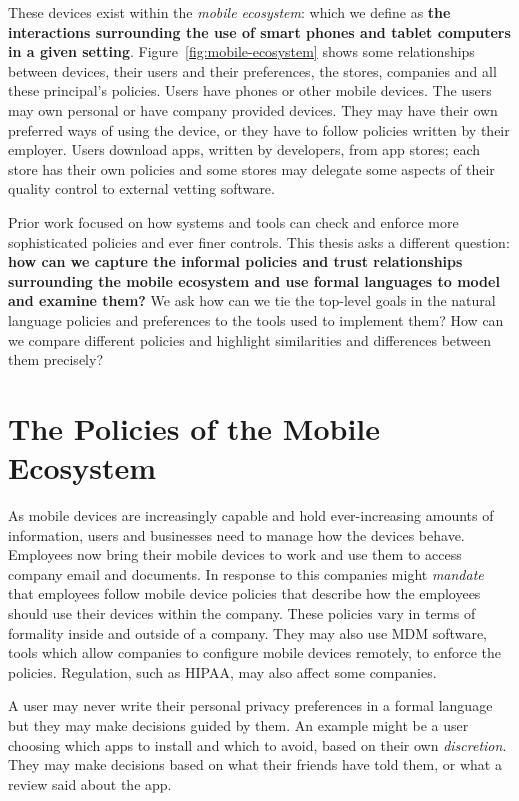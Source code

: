 \documentclass[thesis.tex]{subfiles}
\begin{document}
These devices exist within the \emph{mobile ecosystem}: which we
define as \textbf{the interactions surrounding the use of smart phones
and tablet computers in a given
setting}. Figure~\ref{fig:mobile-ecosystem} shows some relationships
between devices, their users and their preferences, the stores,
companies and all these principal's policies. Users have phones or
other mobile devices. The users may own personal or have company
provided devices. They may have their own preferred ways of using the
device, or they have to follow policies written by their
employer. Users download apps, written by developers, from app stores;
each store has their own policies and some stores may delegate some
aspects of their quality control to external vetting software.

Prior work focused on how systems and tools can check and enforce more
sophisticated policies and ever finer controls. This thesis asks a different
question: \textbf{how can we capture the informal policies and trust
relationships surrounding the mobile ecosystem and use formal languages to model
and examine them?} We ask how can we tie the top-level goals in the natural
language policies and preferences to the tools used to implement them? How can
we compare different policies and highlight similarities and differences between
them precisely?

\section{The Policies of the Mobile Ecosystem}

As mobile devices are increasingly capable and hold ever-increasing amounts of
information, users and businesses need to manage how the devices behave.
Employees now bring their mobile devices to work and use them to access company
email and documents. In response to this companies might \emph{mandate} that
employees follow mobile device policies that describe how the employees should
use their devices within the company. These policies vary in terms of formality
inside and outside of a company. 
They may also use \ac{MDM} software, tools which allow companies to configure
mobile devices remotely, to enforce the policies. Regulation, such as
\ac{HIPAA}, may also affect some companies.

A user may never write their personal privacy preferences in a formal language
but they may make decisions guided by them. An example might be a user choosing
which apps to install and which to avoid, based on their own \emph{discretion}.
They may make decisions based on what their friends have told them, or what a
review said about the app.
\end{document}
